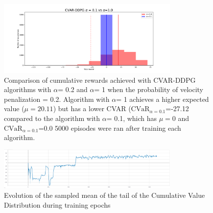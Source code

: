 \begin{figure}[ht]
        \centering
        \includegraphics[width=0.8\textwidth]{images/Car/histogram_rewards1vs01.pdf}
        \caption{Comparison of cumulative rewards achieved with CVAR-DDPG  algorithms with $\alpha$= 0.2
        and $\alpha$= 1 when the probability of velocity penalization = 0.2.
        Algorithm with $\alpha$= 1 achieves a higher expected value ($\mu=20.11$) but 
        has a lower CVAR ($\text{CVaR}_{\alpha= 0.1}$=-27.12 compared to the algorithm
        with $\alpha$= 0.1, which has $\mu=0$ and $\text{CVaR}_{\alpha= 0.1}$=0.0
        5000 episodes were ran after training each algorithm. }
        \label{histogram_alpha01_vs_alpha1}
    
\end{figure}

\begin{figure}[ht]
        \centering
        \includegraphics[width=0.8\textwidth]{images/Car/CVAR/Cvar_evol.png}
        \caption{Evolution of the sampled mean of the tail of the Cumulative Value Distribution during training epochs}
        \label{tail_CDF_EVOL}
    
\end{figure}

